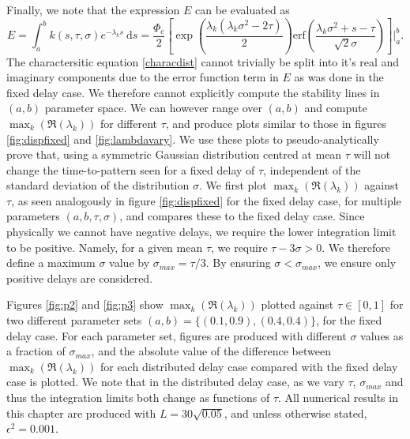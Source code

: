 Finally, we note that the expression $E$ can be evaluated as
\begin{equation}
E=\int_a^bk(s,\tau,\sigma)e^{-\lambda_k s}\ \text{d}s=\frac{\Phi_c}{2}\left[\exp\left(\frac{\lambda_k(\lambda_k\sigma^2-2\tau)}{2}\right) \text{erf} \left(\frac{\lambda_k\sigma^2+s-\tau}{\sqrt{2}\sigma}\right)\right]\Bigg|_a^b.
\end{equation}
The charactersitic equation \eqref{characdist} cannot trivially be split into it's real and imaginary components due to the error function term in $E$ as was done in the fixed delay case. We therefore cannot explicitly compute the stability lines in $(a,b)$ parameter space. We can however range over $(a,b)$ and compute $\max_k(\Re(\lambda_k))$ for different $\tau$, and produce plots similar to those in figures \ref{fig:dispfixed} and \ref{fig:lambdavary}. We use these plots to pseudo-analytically prove that, using a symmetric Gaussian distribution centred at mean $\tau$ will not change the time-to-pattern seen for a fixed delay of $\tau$, independent of the standard deviation of the distribution $\sigma$. We first plot $\max_k(\Re(\lambda_k))$ against $\tau$, as seen analogously in figure \ref{fig:dispfixed} for the fixed delay case, for multiple parameters $(a,b,\tau,\sigma)$, and compares these to the fixed delay case. Since physically we cannot have negative delays, we require the lower integration limit to be positive. Namely, for a given mean $\tau$, we require $\tau-3\sigma>0$. We therefore define a maximum $\sigma$ value by $\sigma_{max}=\tau / 3$. By ensuring $\sigma<\sigma_{max}$, we ensure only positive delays are considered.

Figures \ref{fig:p2} and \ref{fig:p3} show $\max_k(\Re(\lambda_k))$ plotted against $\tau\in[0,1]$ for two different parameter sets $(a,b)=\{(0.1,0.9), (0.4,0.4)\}$, for the fixed delay case. For each parameter set, figures are produced with different $\sigma$ values as a fraction of $\sigma_{max}$, and the absolute value of the difference between $\max_k(\Re(\lambda_k))$ for each distributed delay case compared with the fixed delay case is plotted. We note that in the distributed delay case, as we vary $\tau$, $\sigma_{max}$ and thus the integration limits both change as functions of $\tau$. All numerical results in this chapter are produced with $L=30\sqrt{0.05}$, and unless otherwise stated, $\epsilon^2=0.001$.

